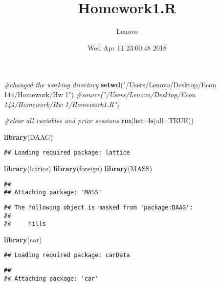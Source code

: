 \documentclass[]{article}
\title{Homework1.R}
\author{Lenovo}
\date{Wed Apr 11 23:00:48 2018}
\newenvironment{Shaded}{\begin{snugshade}}{\end{snugshade}}
\newcommand{\KeywordTok}[1]{\textcolor[rgb]{0.13,0.29,0.53}{\textbf{#1}}}
\newcommand{\DataTypeTok}[1]{\textcolor[rgb]{0.13,0.29,0.53}{#1}}
\newcommand{\StringTok}[1]{\textcolor[rgb]{0.31,0.60,0.02}{#1}}
\newcommand{\CommentTok}[1]{\textcolor[rgb]{0.56,0.35,0.01}{\textit{#1}}}
\newcommand{\OtherTok}[1]{\textcolor[rgb]{0.56,0.35,0.01}{#1}}
\newcommand{\NormalTok}[1]{#1}
\begin{document}
\maketitle

\begin{Shaded}
\begin{Highlighting}[]
\CommentTok{#changed the working directory}
\KeywordTok{setwd}\NormalTok{(}\StringTok{"/Users/Lenovo/Desktop/Econ 144/Homework/Hw 1"}\NormalTok{)}
\CommentTok{#source("/Users/Lenovo/Desktop/Econ 144/Homework/Hw 1/Homework1.R")}

\CommentTok{#clear all variables and prior sessions}
\KeywordTok{rm}\NormalTok{(}\DataTypeTok{list=}\KeywordTok{ls}\NormalTok{(}\DataTypeTok{all=}\OtherTok{TRUE}\NormalTok{))}

\KeywordTok{library}\NormalTok{(DAAG)}
\end{Highlighting}
\end{Shaded}

\begin{verbatim}
## Loading required package: lattice
\end{verbatim}

\begin{Shaded}
\begin{Highlighting}[]
\KeywordTok{library}\NormalTok{(lattice)}
\KeywordTok{library}\NormalTok{(foreign)}
\KeywordTok{library}\NormalTok{(MASS)}
\end{Highlighting}
\end{Shaded}

\begin{verbatim}
## 
## Attaching package: 'MASS'
\end{verbatim}

\begin{verbatim}
## The following object is masked from 'package:DAAG':
## 
##     hills
\end{verbatim}

\begin{Shaded}
\begin{Highlighting}[]
\KeywordTok{library}\NormalTok{(car)}
\end{Highlighting}
\end{Shaded}

\begin{verbatim}
## Loading required package: carData
\end{verbatim}

\begin{verbatim}
## 
## Attaching package: 'car'
\end{verbatim}
\end{document}
